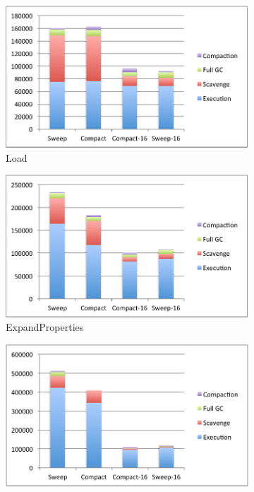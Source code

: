 \documentclass[10pt, sigplan]{acmart}
\begin{document}
%
\begin{figure}[thb]
	\centering
    
    \begin{subfigure}[b]{.48\textwidth}
	\includegraphics[width=\linewidth]{figures/load} 
	\caption{Load\vspace{0.5cm}}
   	\end{subfigure}\hspace{0.03\textwidth}%
   	\begin{subfigure}[b]{.48\textwidth}
	\includegraphics[width=\linewidth]{figures/prop} 
	\caption{ExpandProperties\vspace{0.5cm}}
   	\end{subfigure}	
	\begin{subfigure}[b]{.48\textwidth}
	\includegraphics[width=\linewidth]{figures/propCache} 

\end{subfigure}
\end{figure}
\end{document}
